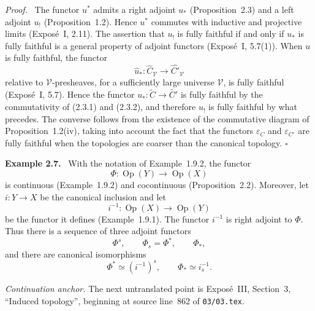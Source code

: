 \documentclass[11pt]{article}
\newcommand{\V}{\mathcal{V}}
\newcommand{\qedtext}{\hfill\(\square\)}
\newenvironment{remarktext}[1]{\par\medskip\noindent\textbf{#1.}\ }{\par\medskip}
\newenvironment{prooftext}{\par\noindent\emph{Proof.}\ }{\par\medskip}
\begin{document}
\begin{prooftext}
The functor \(u^*\) admits a right adjoint \(u_*\) (Proposition~2.3) and a left adjoint \(u_!\) (Proposition~1.2). Hence \(u^*\) commutes with inductive and projective limits (Expos\'e~I, 2.11). The assertion that \(u_!\) is fully faithful if and only if \(u_*\) is fully faithful is a general property of adjoint functors (Expos\'e~I, 5.7(1)). When \(u\) is fully faithful, the functor
\[
\widehat u_*:\widehat C_{\V}\longrightarrow\widehat {C'}_{\V}
\]
relative to \(\V\)-presheaves, for a sufficiently large universe \(\V\), is fully faithful (Expos\'e~I, 5.7). Hence the functor \(u_*:\widetilde C\to\widetilde {C'}\) is fully faithful by the commutativity of (2.3.1) and (2.3.2), and therefore \(u_!\) is fully faithful by what precedes. The converse follows from the existence of the commutative diagram of Proposition~1.2(iv), taking into account the fact that the functors \(\varepsilon_C\) and \(\varepsilon_{C'}\) are fully faithful when the topologies are coarser than the canonical topology. \qedtext
\end{prooftext}

\begin{remarktext}{Example 2.7}
With the notation of Example~1.9.2, the functor
\[
\Phi:\operatorname{Op}(Y)\longrightarrow\operatorname{Op}(X)
\]
is continuous (Example~1.9.2) and cocontinuous (Proposition~2.2). Moreover, let \(i:Y\to X\) be the canonical inclusion and let
\[
i^{-1}:\operatorname{Op}(X)\longrightarrow\operatorname{Op}(Y)
\]
be the functor it defines (Example~1.9.1). The functor \(i^{-1}\) is right adjoint to \(\Phi\). Thus there is a sequence of three adjoint functors
\[
\Phi^s,\qquad \Phi_s=\Phi^*,\qquad \Phi_*,
\]
and there are canonical isomorphisms
\[
\Phi^*\simeq (i^{-1})^s,
\qquad
\Phi_*\simeq i^{-1}_s.
\]
\end{remarktext}

\bigskip
\noindent\emph{Continuation anchor.} The next untranslated point is Expos\'e~III, Section~3, ``Induced topology'', beginning at source line~862 of \texttt{03/03.tex}.
\end{document}
